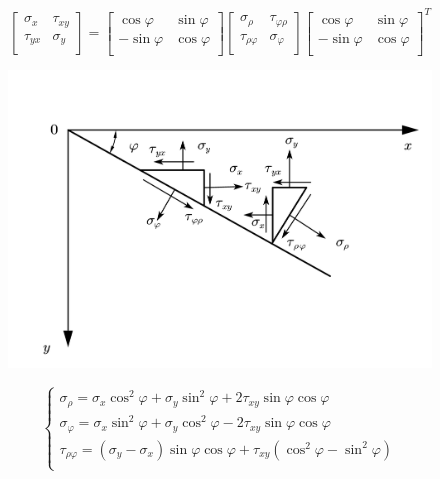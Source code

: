 \begin{equation}
\left[ \begin{matrix}
\sigma _x&		\tau _{xy}\\
\tau _{yx}&		\sigma _y\\
\end{matrix} \right] =\left[ \begin{matrix}
\cos \varphi&		\sin \varphi\\
-\sin \varphi&		\cos \varphi\\
\end{matrix} \right] \left[ \begin{matrix}
\sigma _{\rho}&		\tau _{\varphi \rho}\\
\tau _{\rho \varphi}&		\sigma _{\varphi}\\
\end{matrix} \right] \left[ \begin{matrix}
\cos \varphi&		\sin \varphi\\
-\sin \varphi&		\cos \varphi\\
\end{matrix} \right] ^T
\end{equation}
\begin{figure}[!h]
	\centering
	\includegraphics[scale=0.5]{figure/4-4.png}
	\caption{}
\end{figure}
\begin{equation}
\begin{cases}
\sigma _{\rho}=\sigma _x\cos ^2\varphi +\sigma _y\sin ^2\varphi +2\tau _{xy}\sin \varphi \cos \varphi\\
\sigma _{\varphi}=\sigma _x\sin ^2\varphi +\sigma _y\cos ^2\varphi -2\tau _{xy}\sin \varphi \cos \varphi\\
\tau _{\rho \varphi}=\left( \sigma _y-\sigma _x \right) \sin \varphi \cos \varphi +\tau _{xy}\left( \cos ^2\varphi -\sin ^2\varphi \right)\\
\end{cases}
\end{equation}
